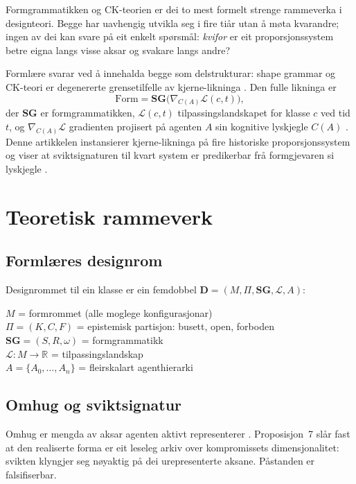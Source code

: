 \documentclass[10pt,twocolumn]{article}
\begin{document}
Formgrammatikken \citep{StinyGips1972,StinyMitchell1978,Benros2012,Duarte2005} og CK-teorien \citep{HatchuelWeil2009,Kazakci2009} er dei to mest formelt strenge rammeverka i designteori. Begge har uavhengig utvikla seg i fire tiår utan \aa{} m\o{}ta kvarandre; ingen av dei kan svare p\aa{} eit enkelt sp\o{}rsm\aa l: \emph{kvifor} er eit proporsjonssystem betre eigna langs visse aksar og svakare langs andre?

Forml\ae re \citep{Finne2026} svarar ved \aa{} innehalda begge som delstrukturar: shape grammar og CK-teori er degenererte grensetilfelle av kjerne-likninga \citep[prop.~5.72]{Finne2026}. Den fulle likninga er
\begin{equation}
\mathrm{Form} = \mathbf{SG}\bigl(\nabla_{C(A)} \mathcal{L}(c,t)\bigr),
\label{eq:core}
\end{equation}
der $\mathbf{SG}$ er formgrammatikken, $\mathcal{L}(c,t)$ tilpassingslandskapet for klasse $c$ ved tid $t$, og $\nabla_{C(A)}\mathcal{L}$ gradienten projisert p\aa{} agenten $A$ sin kognitive lyskjegle $C(A)$ \citep{FieldsLevin2022}. Denne artikkelen instansierer kjerne-likninga p\aa{} fire historiske proporsjonssystem og viser at sviktsignaturen til kvart system er predikerbar fr\aa{} formgjevaren si lyskjegle \citep[prop.~7.15]{Finne2026}.

\section{Teoretisk rammeverk}

\subsection{Forml\ae res designrom}
Designrommet til ein klasse er ein femdobbel $\mathbf{D} = (M, \Pi, \mathbf{SG}, \mathcal{L}, A)$:

\noindent
$M$ = formrommet (alle moglege konfigurasjonar)\\
$\Pi = (K, C, F)$ = epistemisk partisjon: busett, open, forboden\\
$\mathbf{SG} = (S, R, \omega)$ = formgrammatikk\\
$\mathcal{L}\colon M \to \mathbb{R}$ = tilpassingslandskap\\
$A = \{A_0, \ldots, A_n\}$ = fleirskalart agenthierarki

\subsection{Omhug og sviktsignatur}
Omhug er mengda av aksar agenten aktivt representerer \citep{FieldsLevin2022}. Proposisjon~7 sl\aa r fast at den realiserte forma er eit leseleg arkiv over kompromissets dimensjonalitet: svikten klyngjer seg n\o{}yaktig p\aa{} dei urepresenterte aksane. P\aa standen er falsifiserbar.
\end{document}
